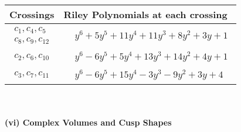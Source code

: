 \documentclass[1p]{elsarticle_modified}
\theoremstyle{definition}
\begin{document}
\begin{tabular}{m{50pt}|m{274pt}}
Crossings & \hspace{64pt}Riley Polynomials at each crossing \\
\hline $$\begin{aligned}c_{1},c_{4},c_{5}\\c_{8},c_{9},c_{12}\end{aligned}$$&$\begin{aligned}
&y^6+5 y^5+11 y^4+11 y^3+8 y^2+3 y+1
\end{aligned}$\\
\hline $$\begin{aligned}c_{2},c_{6},c_{10}\end{aligned}$$&$\begin{aligned}
&y^6-6 y^5+5 y^4+13 y^3+14 y^2+4 y+1
\end{aligned}$\\
\hline $$\begin{aligned}c_{3},c_{7},c_{11}\end{aligned}$$&$\begin{aligned}
&y^6-6 y^5+15 y^4-3 y^3-9 y^2+3 y+4
\end{aligned}$\\
\hline
\end{tabular}\\~\\
\newpage\flushleft \textbf{(vi) Complex Volumes and Cusp Shapes}
\end{document}
